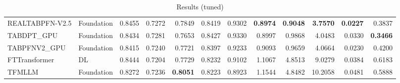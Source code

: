 \begin{table}[htbp]
{\begin{tabular}{ll|rrrrrrrrrr}
REALTABPFN-V2.5 & Foundation & 0.8455 & 0.7272 & 0.7849 & 0.8419 & 0.9302 & \textbf{0.8974} & \textbf{0.9048} & \textbf{3.7570} & \textbf{0.0227} & 0.3837 \\
TABDPT\_GPU & Foundation & 0.8434 & 0.7281 & 0.7653 & 0.8427 & 0.9330 & 0.8997 & 0.9868 & 4.0483 & 0.0330 & \textbf{0.3466} \\
TABPFNV2\_GPU & Foundation & 0.8415 & 0.7240 & 0.7721 & 0.8397 & 0.9233 & 0.9093 & 0.9659 & 4.0664 & 0.0230 & 0.4200 \\
\midrule
FTTransformer & DL & 0.8444 & 0.7204 & 0.7729 & 0.8232 & 0.9102 & 1.1067 & 4.8513 & 9.0279 & 0.0384 & 0.6183 \\
TFMLLM & Foundation & 0.8272 & 0.7236 & \textbf{0.8051} & 0.8223 & 0.8923 & 1.1544 & 4.8482 & 10.2058 & 0.0481 & 0.5888 \\
\bottomrule
\end{tabular}
}
\caption{Results (tuned)}
\label{tab:results_tuned}
\end{table}